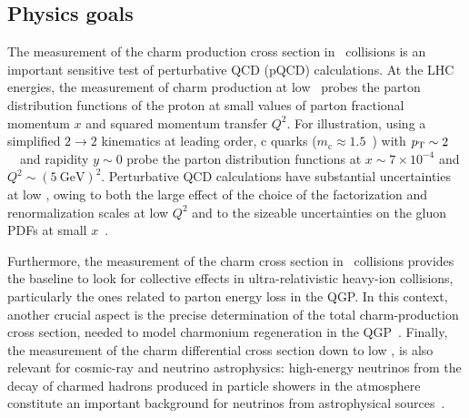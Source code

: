 \documentclass[12pt, a4paper, twoside, titlepage]{article}
\begin{document}
\subsection{Physics goals}
The measurement of the charm production cross section in \pp\ collisions is an important sensitive test of perturbative QCD (pQCD) calculations.
At the LHC energies, the measurement of charm production at low \pt\ probes the parton distribution functions
of the proton at small values of parton fractional momentum $x$ and squared momentum transfer $Q^2$.
For illustration, using a simplified $2 \rightarrow 2$ kinematics at leading order, c quarks ($m_{\mathrm{c}} \approx 1.5$~\GeVcsq) with
$p_{\rm T} \sim 2$~\GeVc\ and rapidity $y \sim 0$ probe the parton distribution functions at $x \sim 7 \times 10^{-4}$ and
$Q^2 \sim (5~\mathrm{GeV})^2$.
Perturbative QCD calculations have substantial uncertainties at low \pt, owing to both the large effect of the
choice of the factorization and renormalization scales at low $Q^2$ and to the sizeable uncertainties on the
gluon PDFs at small $x$~\cite{Cacciari:2015}. 

Furthermore, the measurement of the charm cross section in \pp\ collisions provides the baseline to look for collective effects in ultra-relativistic
heavy-ion collisions, particularly the ones related to parton energy loss in the QGP. In this context, another crucial aspect is the precise determination of the
total charm-production cross section, needed to model charmonium regeneration in the QGP~\cite{Zhao:2011}.
Finally, the measurement of the charm differential cross section down to low \pt, is also relevant for cosmic-ray and neutrino
astrophysics: high-energy neutrinos from the decay of charmed hadrons produced in particle showers in the atmosphere constitute an important
background for neutrinos from astrophysical sources~\cite{Gauld:2015, Bhattacharya:2015}.
\end{document}
